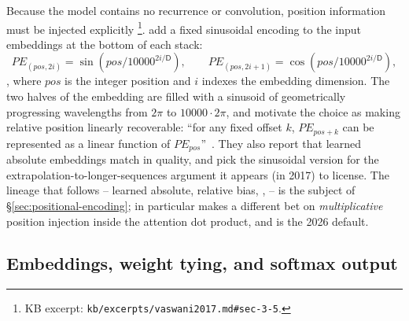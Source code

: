 Because the model contains no recurrence or convolution, position
information must be injected explicitly%
\footnote{KB excerpt: \texttt{kb/excerpts/vaswani2017.md\#sec-3-5}.}.
\citet{vaswani2017} add a fixed sinusoidal encoding to the input
embeddings at the bottom of each stack:
\begin{equation}
  PE_{(pos, 2i)}   = \sin(pos / 10000^{2i/\mathsf{D}}),
  \qquad
  PE_{(pos, 2i+1)} = \cos(pos / 10000^{2i/\mathsf{D}}),
  \tag{Vaswani--PE}
  \label{eq:vaswani-pe}
\end{equation}
\citep[\S 3.5]{vaswani2017}, where $pos$ is the integer position
and $i$ indexes the embedding dimension. The two halves of the
embedding are filled with a sinusoid of geometrically progressing
wavelengths from $2\pi$ to $10000 \cdot 2\pi$, and
\citet{vaswani2017} motivate the choice as making relative position
linearly recoverable: ``for any fixed offset $k$, $PE_{pos + k}$
can be represented as a linear function of $PE_{pos}$''~\citep[\S
3.5]{vaswani2017}. They also report that learned absolute embeddings
match in quality, and pick the sinusoidal version for the
extrapolation-to-longer-sequences argument it appears (in 2017) to
license. The lineage that follows -- learned absolute,  relative
bias, ,  -- is the subject of \S\ref{sec:positional-encoding};
 in particular makes a different bet on \emph{multiplicative}
position injection inside the attention dot product, and is the
2026 default.

\subsection{Embeddings, weight tying, and softmax output}
\label{sec:canonical-embed}


